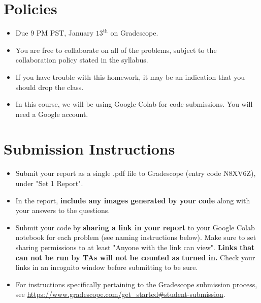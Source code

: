 \newif\ifshowsolutions
\showsolutionstrue





\pagestyle{fancy}




\section*{Policies}
\begin{itemize}
	\item Due 9 PM PST, January $13^\text{th}$ on Gradescope. 
	\item You are free to collaborate on all of the problems, subject to the collaboration policy stated in the syllabus.
	\item If you have trouble with this homework, it may be an indication that you should drop the class.
	\item In this course, we will be using Google Colab for code submissions. You will need a Google account.
\end{itemize}

\section*{Submission Instructions}

\begin{itemize}
	\item Submit your report as a single .pdf file to Gradescope (entry code N8XV6Z), under "Set 1 Report". 
	\item In the report, \textbf{include any images generated by your code} along with your answers to the questions.
	\item Submit your code by \textbf{sharing a link in your report} to your Google Colab notebook for each problem (see naming instructions below). Make sure to set sharing permissions to at least "Anyone with the link can view". \textbf{Links that can not be run by TAs will not be counted as turned in.} Check your links in an incognito window before submitting to be sure. 
	\item For instructions specifically pertaining to the Gradescope submission process, see \url{https://www.gradescope.com/get_started#student-submission}.
	
\end{itemize}


